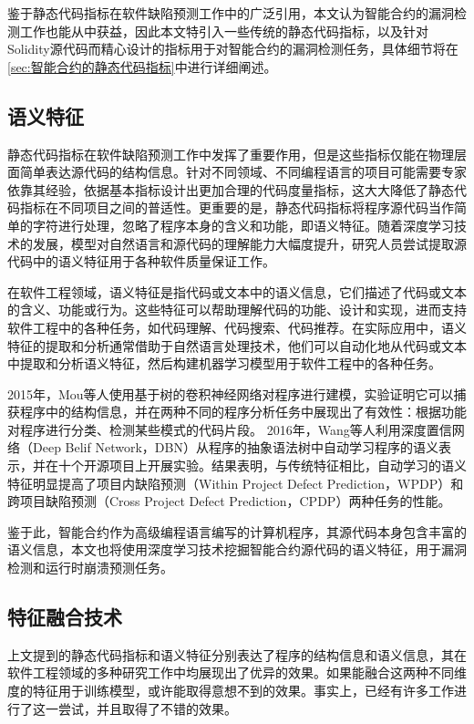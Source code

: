 鉴于静态代码指标在软件缺陷预测工作中的广泛引用，本文认为智能合约的漏洞检测工作也能从中获益，因此本文特引入一些传统的静态代码指标，以及针对Solidity源代码而精心设计的指标用于对智能合约的漏洞检测任务，具体细节将在\autoref{sec:智能合约的静态代码指标}中进行详细阐述。
\subsection{语义特征}
静态代码指标在软件缺陷预测工作中发挥了重要作用，但是这些指标仅能在物理层面简单表达源代码的结构信息。针对不同领域、不同编程语言的项目可能需要专家依靠其经验，依据基本指标设计出更加合理的代码度量指标，这大大降低了静态代码指标在不同项目之间的普适性。更重要的是，静态代码指标将程序源代码当作简单的字符进行处理，忽略了程序本身的含义和功能，即语义特征。随着深度学习技术的发展，模型对自然语言和源代码的理解能力大幅度提升，研究人员尝试提取源代码中的语义特征用于各种软件质量保证工作。

在软件工程领域，语义特征是指代码或文本中的语义信息，它们描述了代码或文本的含义、功能或行为。这些特征可以帮助理解代码的功能、设计和实现，进而支持软件工程中的各种任务，如代码理解、代码搜索、代码推荐。在实际应用中，语义特征的提取和分析通常借助于自然语言处理技术，他们可以自动化地从代码或文本中提取和分析语义特征，然后构建机器学习模型用于软件工程中的各种任务。

2015年，Mou等人\cite{mou2015convolutional}使用基于树的卷积神经网络对程序进行建模，实验证明它可以捕获程序中的结构信息，并在两种不同的程序分析任务中展现出了有效性：根据功能对程序进行分类、检测某些模式的代码片段。
2016年，Wang等人\cite{semantic2016}利用深度置信网络（Deep Belif Network，DBN）从程序的抽象语法树中自动学习程序的语义表示，并在十个开源项目上开展实验。结果表明，与传统特征相比，自动学习的语义特征明显提高了项目内缺陷预测（Within Project Defect Prediction，WPDP）和跨项目缺陷预测（Cross Project Defect Prediction，CPDP）两种任务的性能。

鉴于此，智能合约作为高级编程语言编写的计算机程序，其源代码本身包含丰富的语义信息，本文也将使用深度学习技术挖掘智能合约源代码的语义特征，用于漏洞检测和运行时崩溃预测任务。

\subsection{特征融合技术}
上文提到的静态代码指标和语义特征分别表达了程序的结构信息和语义信息，其在软件工程领域的多种研究工作中均展现出了优异的效果。如果能融合这两种不同维度的特征用于训练模型，或许能取得意想不到的效果。事实上，已经有许多工作进行了这一尝试，并且取得了不错的效果。

